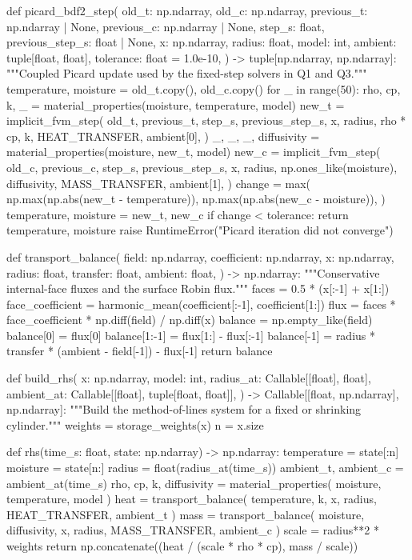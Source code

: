 \documentclass[withoutpreface,bwprint]{cumcmthesis}
\begin{document}
\begin{PythonCode}
def picard_bdf2_step(
    old_t: np.ndarray,
    old_c: np.ndarray,
    previous_t: np.ndarray | None,
    previous_c: np.ndarray | None,
    step_s: float,
    previous_step_s: float | None,
    x: np.ndarray,
    radius: float,
    model: int,
    ambient: tuple[float, float],
    tolerance: float = 1.0e-10,
) -> tuple[np.ndarray, np.ndarray]:
    """Coupled Picard update used by the fixed-step solvers in Q1 and Q3."""
    temperature, moisture = old_t.copy(), old_c.copy()
    for _ in range(50):
        rho, cp, k, _ = material_properties(moisture, temperature, model)
        new_t = implicit_fvm_step(
            old_t, previous_t, step_s, previous_step_s, x, radius,
            rho * cp, k, HEAT_TRANSFER, ambient[0],
        )
        _, _, _, diffusivity = material_properties(moisture, new_t, model)
        new_c = implicit_fvm_step(
            old_c, previous_c, step_s, previous_step_s, x, radius,
            np.ones_like(moisture), diffusivity, MASS_TRANSFER, ambient[1],
        )
        change = max(
            np.max(np.abs(new_t - temperature)),
            np.max(np.abs(new_c - moisture)),
        )
        temperature, moisture = new_t, new_c
        if change < tolerance:
            return temperature, moisture
    raise RuntimeError("Picard iteration did not converge")


def transport_balance(
    field: np.ndarray,
    coefficient: np.ndarray,
    x: np.ndarray,
    radius: float,
    transfer: float,
    ambient: float,
) -> np.ndarray:
    """Conservative internal-face fluxes and the surface Robin flux."""
    faces = 0.5 * (x[:-1] + x[1:])
    face_coefficient = harmonic_mean(coefficient[:-1], coefficient[1:])
    flux = faces * face_coefficient * np.diff(field) / np.diff(x)
    balance = np.empty_like(field)
    balance[0] = flux[0]
    balance[1:-1] = flux[1:] - flux[:-1]
    balance[-1] = radius * transfer * (ambient - field[-1]) - flux[-1]
    return balance


def build_rhs(
    x: np.ndarray,
    model: int,
    radius_at: Callable[[float], float],
    ambient_at: Callable[[float], tuple[float, float]],
) -> Callable[[float, np.ndarray], np.ndarray]:
    """Build the method-of-lines system for a fixed or shrinking cylinder."""
    weights = storage_weights(x)
    n = x.size

    def rhs(time_s: float, state: np.ndarray) -> np.ndarray:
        temperature = state[:n]
        moisture = state[n:]
        radius = float(radius_at(time_s))
        ambient_t, ambient_c = ambient_at(time_s)
        rho, cp, k, diffusivity = material_properties(
            moisture, temperature, model
        )
        heat = transport_balance(
            temperature, k, x, radius, HEAT_TRANSFER, ambient_t
        )
        mass = transport_balance(
            moisture, diffusivity, x, radius, MASS_TRANSFER, ambient_c
        )
        scale = radius**2 * weights
        return np.concatenate((heat / (scale * rho * cp), mass / scale))


\end{PythonCode}
\end{document}
